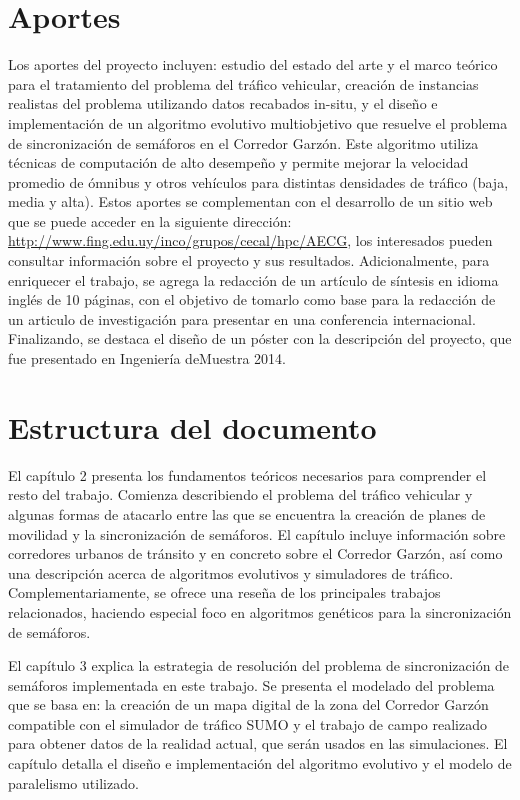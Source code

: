 \section{Aportes}
Los aportes del proyecto incluyen: estudio del estado del arte y el marco teórico para el tratamiento del problema del tráfico vehicular, creación de instancias realistas del problema utilizando datos recabados in-situ, y el diseño e implementación de un algoritmo evolutivo multiobjetivo que resuelve el problema de sincronización de semáforos en el Corredor Garzón. Este algoritmo utiliza técnicas de computación de alto desempeño y permite mejorar la velocidad promedio de ómnibus y otros vehículos para distintas densidades de tráfico (baja, media y alta). Estos aportes se complementan con el desarrollo de un sitio web que se puede acceder en la siguiente dirección: \url{http://www.fing.edu.uy/inco/grupos/cecal/hpc/AECG}, los interesados pueden consultar información sobre el proyecto y sus resultados. Adicionalmente, para enriquecer el trabajo, se agrega la redacción de un artículo de síntesis en idioma inglés de 10 páginas, con el objetivo de tomarlo como base para la redacción de un articulo de investigación para presentar en una conferencia internacional. Finalizando, se destaca el diseño de un póster con la descripción del proyecto, que fue presentado en Ingeniería deMuestra 2014.



\section{Estructura del documento}
El capítulo 2 presenta los fundamentos teóricos necesarios para comprender el resto del trabajo. Comienza describiendo el problema del tráfico vehicular y algunas formas de atacarlo entre las que se encuentra la creación de planes de movilidad y la sincronización de semáforos. El capítulo incluye información sobre corredores urbanos de tránsito y en concreto sobre el Corredor Garzón, así como una descripción acerca de algoritmos evolutivos y simuladores de tráfico. Complementariamente, se ofrece una reseña de los principales trabajos relacionados, haciendo especial foco en algoritmos genéticos para la sincronización de semáforos.

El capítulo 3 explica la estrategia de resolución del problema de sincronización de semáforos implementada en este trabajo. Se presenta el modelado del problema que se basa en: la creación de un mapa digital de la zona del Corredor Garzón compatible con el simulador de tráfico SUMO y el trabajo de campo realizado para obtener datos de la realidad actual, que serán usados en las simulaciones. El capítulo detalla el diseño e implementación del algoritmo evolutivo y el modelo de paralelismo utilizado.

